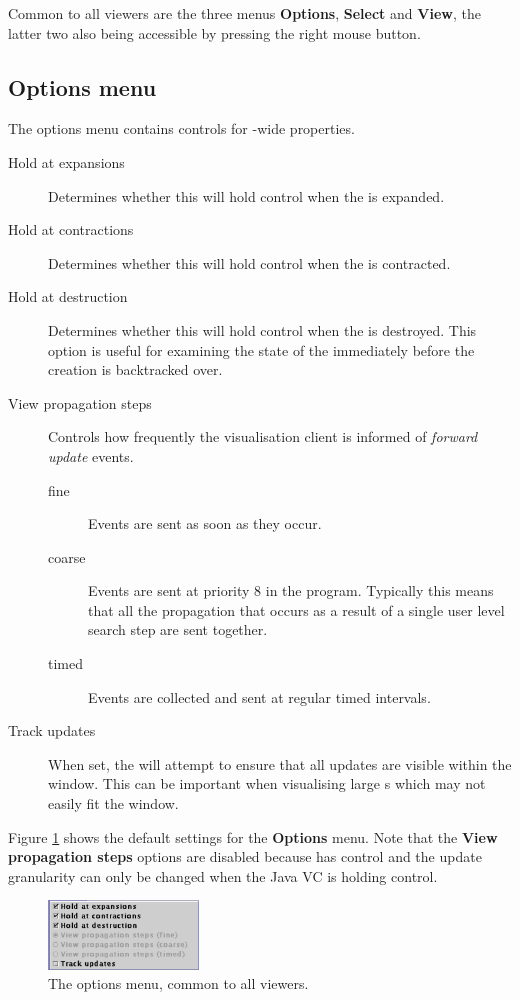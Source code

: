 Common to all viewers are the three menus \textbf{Options},
\textbf{Select} and \textbf{View}, the latter two also being
accessible by pressing the right mouse button.

\subsection{Options menu}
The options menu contains controls for \viewer{}-wide properties.
\begin{description}
\item[Hold at expansions] Determines whether this \viewer{} will hold
control when the \viewable{} is expanded.
\item[Hold at contractions] Determines whether this \viewer{} will hold
control when the \viewable{} is contracted.
\item[Hold at destruction] Determines whether this \viewer{} will hold
control when the \viewable{} is destroyed.  This option is useful for
examining the state of the \viewable{} immediately before the
creation is backtracked over.
\item[View propagation steps] Controls how frequently the visualisation client is informed of \emph{forward update} events.

  \begin{description}
  \item[fine] Events are sent as soon as they occur.
  \item[coarse] Events are sent at priority 8 in the {\eclipse}
  program.  Typically this means that all the propagation that occurs
  as a result of a single user level search step are sent together.
  \item[timed] Events are collected and sent at regular timed
  intervals.
  \end{description}

\item[Track updates] When set, the \viewer{} will attempt to ensure
that all updates are visible within the window.  This can be important
when visualising large \viewable{}s which may not easily fit the
window.
\end{description}

Figure \ref{fig:optionsmenu} shows the default settings for the
\textbf{Options} menu.  Note that the \textbf{View propagation steps}
options are disabled because {\eclipse} has control and the update
granularity can only be changed when the Java VC is holding control.

\begin{figure}[htp]
\centering
\includegraphics[width=4cm]{vcoptionsmenu}
\caption{The options menu, common to all viewers.}
\label{fig:optionsmenu}
\end{figure}

